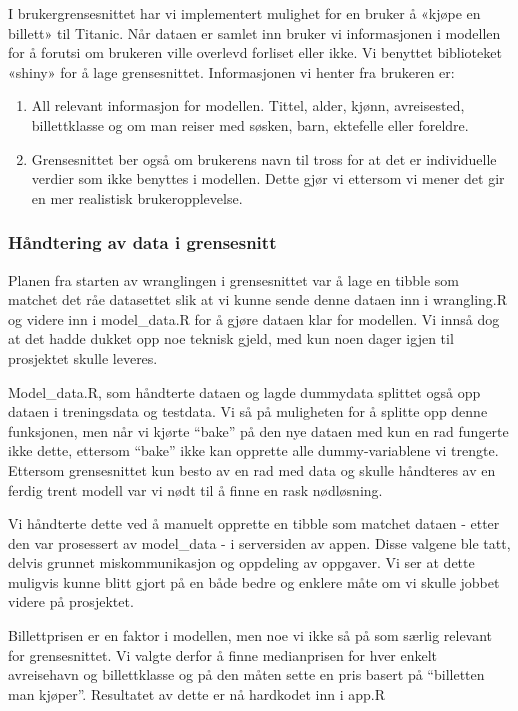 \documentclass[
]{article}
\providecommand{\tightlist}{%
  \setlength{\itemsep}{0pt}\setlength{\parskip}{0pt}}
\begin{document}
I brukergrensesnittet har vi implementert mulighet for en bruker å
«kjøpe en billett» til Titanic. Når dataen er samlet inn bruker vi
informasjonen i modellen for å forutsi om brukeren ville overlevd
forliset eller ikke. Vi benyttet biblioteket «shiny» for å lage
grensesnittet. Informasjonen vi henter fra brukeren er:

\begin{enumerate}
\def\labelenumi{\arabic{enumi}.}
\tightlist
\item
  All relevant informasjon for modellen. Tittel, alder, kjønn,
  avreisested, billettklasse og om man reiser med søsken, barn,
  ektefelle eller foreldre.
\item
  Grensesnittet ber også om brukerens navn til tross for at det er
  individuelle verdier som ikke benyttes i modellen. Dette gjør vi
  ettersom vi mener det gir en mer realistisk brukeropplevelse.
\end{enumerate}

\subsubsection{Håndtering av data i
grensesnitt}\label{huxe5ndtering-av-data-i-grensesnitt}

Planen fra starten av wranglingen i grensesnittet var å lage en tibble
som matchet det råe datasettet slik at vi kunne sende denne dataen inn i
wrangling.R og videre inn i model\_data.R for å gjøre dataen klar for
modellen. Vi innså dog at det hadde dukket opp noe teknisk gjeld, med
kun noen dager igjen til prosjektet skulle leveres.

Model\_data.R, som håndterte dataen og lagde dummydata splittet også opp
dataen i treningsdata og testdata. Vi så på muligheten for å splitte opp
denne funksjonen, men når vi kjørte ``bake'' på den nye dataen med kun
en rad fungerte ikke dette, ettersom ``bake'' ikke kan opprette alle
dummy-variablene vi trengte. Ettersom grensesnittet kun besto av en rad
med data og skulle håndteres av en ferdig trent modell var vi nødt til å
finne en rask nødløsning.

Vi håndterte dette ved å manuelt opprette en tibble som matchet dataen -
etter den var prosessert av model\_data - i serversiden av appen. Disse
valgene ble tatt, delvis grunnet miskommunikasjon og oppdeling av
oppgaver. Vi ser at dette muligvis kunne blitt gjort på en både bedre og
enklere måte om vi skulle jobbet videre på prosjektet.

Billettprisen er en faktor i modellen, men noe vi ikke så på som særlig
relevant for grensesnittet. Vi valgte derfor å finne medianprisen for
hver enkelt avreisehavn og billettklasse og på den måten sette en pris
basert på ``billetten man kjøper''. Resultatet av dette er nå hardkodet
inn i app.R
\end{document}
